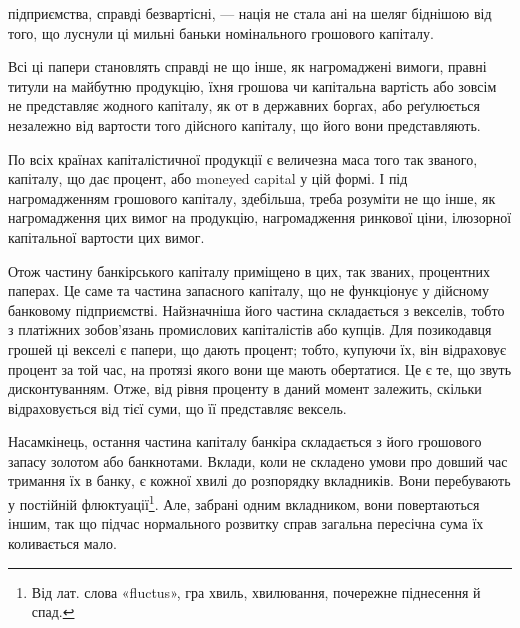 \parcont{}  %
підприємства, справді безвартісні, — нація не стала ані на шеляг біднішою
від того, що луснули ці мильні баньки номінального грошового капіталу.

Всі ці папери становлять справді не що інше, як нагромаджені вимоги,
правні титули на майбутню продукцію, їхня грошова чи капітальна вартість
або зовсім не представляє жодного капіталу, як от в державних боргах, або
реґулюється незалежно від вартости того дійсного капіталу, що його вони представляють.

По всіх країнах капіталістичної продукції є величезна маса того так званого,
капіталу, що дає процент, або moneyed capital у цій формі. І під нагромадженням
грошового капіталу, здебільша, треба розуміти не що інше, як нагромадження
цих вимог на продукцію, нагромадження ринкової ціни, ілюзорної
капітальної вартости цих вимог.

Отож частину банкірського капіталу приміщено в цих, так званих, процентних
паперах. Це саме та частина запасного капіталу, що не функціонує
у дійсному банковому підприємстві. Найзначніша його частина складається з
векселів, тобто з платіжних зобов’язань промислових капіталістів або купців.
Для позикодавця грошей ці векселі є папери, що дають процент; тобто, купуючи
їх, він відраховує процент за той час, на протязі якого вони ще мають обертатися.
Це є те, що звуть дисконтуванням. Отже, від рівня проценту в даний момент
залежить, скільки відраховується від тієї суми, що її представляє вексель.

Насамкінець, остання частина капіталу банкіра складається з його грошового
запасу золотом або банкнотами. Вклади, коли не складено умови про
довший час тримання їх в банку, є кожної хвилі до розпорядку вкладників.
Вони перебувають у постійній флюктуації\footnote*{
Від лат. слова «fluctus», гра хвиль, хвилювання, почережне піднесення й спад. 
}. Але, забрані одним вкладником, вони
повертаються іншим, так що підчас нормального розвитку справ загальна пересічна
сума їх коливається мало.

